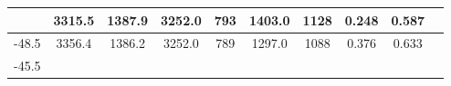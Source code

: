 \documentclass[a4paper,12pt]{article}
\begin{document}
\begin{longtable}{
     |
%    
    c|
%    
    c|
%    
    c|
%    
    c|
%    
    c|
%    
    c|
%    
    c|
%    
    c|
%    
    c|
%    
    c|
%    
    }
%        
        & 3315.5
%        

%        

%        
        & 1387.9
%        

%        

%        
        & 3252.0
%        

%        

%        
        & 793
%        

%        

%        
        & 1403.0
%        

%        

%        
        & 1128
%        

%        

%        
        & 0.248
%        

%        

%        
        & 0.587
%        

%        
        \\
        \hline

        

%        

%        
        -48.5
%        

%        

%        
        & 3356.4
%        

%        

%        
        & 1386.2
%        

%        

%        
        & 3252.0
%        

%        

%        
        & 789
%        

%        

%        
        & 1297.0
%        

%        

%        
        & 1088
%        

%        

%        
        & 0.376
%        

%        

%        
        & 0.633
%        

%        
        \\
        \hline

        

%        

%        
        -45.5
%        

%        


\end{longtable}
\end{document}

